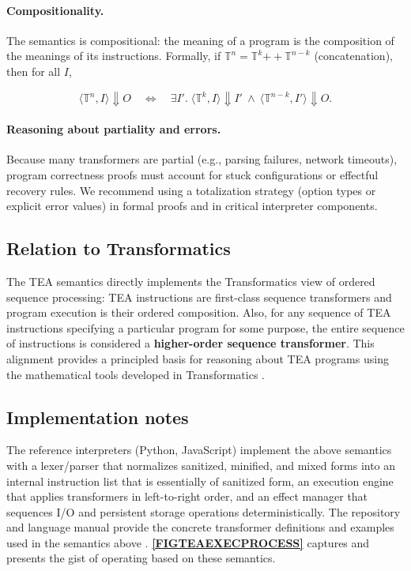 \documentclass[acmtoplas]{acmart}
\begin{document}
\paragraph{Compositionality.} The semantics is compositional: the meaning of a program is the composition of the meanings of its instructions.  Formally, if \(\mathbb{T}^n = \mathbb{T}^k \mathbin{+\!\!+} \mathbb{T}^{n-k}\) (concatenation), then for all \(I\),


\vspace{1em}
\[
\langle \mathbb{T}^n, I \rangle \Downarrow O \quad\Longleftrightarrow\quad
\exists I'.\; \langle \mathbb{T}^k, I \rangle \Downarrow I' \ \wedge\ \langle \mathbb{T}^{n-k}, I' \rangle \Downarrow O.
\]
\vspace{1em}


\paragraph{Reasoning about partiality and errors.} Because many transformers are partial (e.g., parsing failures, network timeouts), program correctness proofs must account for stuck configurations or effectful recovery rules.  We recommend using a totalization strategy (option types or explicit error values) in formal proofs and in critical interpreter components.

\subsection{Relation to Transformatics}
The TEA semantics directly implements the Transformatics view of ordered sequence processing: TEA instructions are first-class sequence transformers and program execution is their ordered composition. Also, for any sequence of TEA instructions specifying a particular program for some purpose, the entire sequence of instructions is considered a \textbf{higher-order sequence transformer}.  This alignment provides a principled basis for reasoning about TEA programs using the mathematical tools developed in Transformatics \cite{Lutalo2025_transformatics_thesis}.

\subsection{Implementation notes}

The reference interpreters (Python, JavaScript) implement the above semantics with a lexer/parser that normalizes sanitized, minified, and mixed forms into an internal instruction list that is essentially of sanitized form, an execution engine that applies transformers in left-to-right order, and an effect manager that sequences I/O and persistent storage operations deterministically.  The repository and language manual provide the concrete transformer definitions and examples used in the semantics above \cite{cli_tttt,Lutalo2024TEATAZ}. \textbf{\autoref{FIGTEAEXECPROCESS}} captures and presents the gist of operating based on these semantics.
\end{document}

